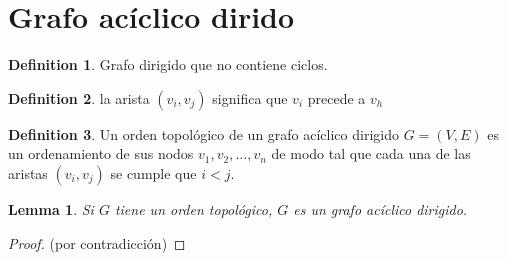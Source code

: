 \documentclass[12pt, fleqn]{article}
\newtheorem{lemma}{Lemma}[section]
\theoremstyle{definition}
\newtheorem{definition}{Definition}[section]
\begin{document}
        \section{Grafo acíclico dirido}
            \begin{definition}
                Grafo dirigido que no contiene ciclos. 
            \end{definition}
            \begin{definition}
                la arista $(v_i,v_j)$ significa que $v_i$ precede a $v_h$
            \end{definition}
            \begin{definition}
                Un orden topológico de un grafo acíclico dirigido $G = (V,E)$ es un ordenamiento de sus
                nodos $v_1, v_2, \ldots,v_n$ de modo tal que cada una de las aristas $(v_i, v_j)$ se cumple que
                $i < j$.
            \end{definition}
            \begin{lemma}
                Si $G$ tiene un orden topológico, $G$ es un grafo acíclico dirigido.
            \end{lemma}
            \begin{proof}
                (por contradicción) 
            \end{proof}
\end{document}
